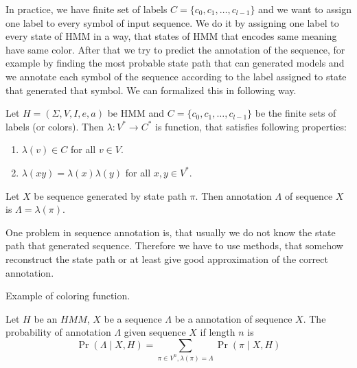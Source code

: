 In practice, we have finite set of labels $C=\{c_0,c_1,\dots,c_{l-1}\}$ and we
want to assign one label to every symbol of input sequence. We do it by
assigning one label to every state of HMM in a way, that states of HMM that
encodes same meaning have same color. After that we try to predict the
annotation of the sequence, for example by finding the most probable state path
that can generated models and we annotate each symbol of the sequence according
to the label assigned to state that generated that symbol. We can formalized
this in following way.


\begin{definition}
Let $H=(\Sigma,V,I,e,a)$ be HMM and $C=\{c_0,c_1,\dots,c_{l-1}\}$ be the finite
sets of labels (or colors). Then  
$\lambda: V^*\to C^*$ is function, that satisfies following properties:
\begin{enumerate}
\item $\lambda(v)\in C$ for all $v\in V$.
\item $\lambda(xy) = \lambda(x)\lambda(y)$ for all $x,y\in V^*$.
\end{enumerate}

Let $X$ be sequence generated by state path $\pi$. Then annotation
$\Lambda$ of sequence $X$ is $\Lambda = \lambda(\pi)$.
\end{definition}

One problem in sequence annotation is, that usually we do not know the state
path that generated sequence. Therefore we have to use methods, that somehow
reconstruct the state path or at least give good approximation of the correct
annotation. 

\begin{example}
Example of coloring function.
\end{example}


\begin{definition}
Let $H$ be an $HMM$, $X$ be a sequence $\Lambda$ be a annotation of sequence
$X$. The probability of annotation $\Lambda$ given sequence $X$ if length $n$ is 
\begin{equation}
\Pr\left(\Lambda\mid X,H\right)=\sum_{\pi \in V^n,\lambda(\pi) =
\Lambda}\Pr\left(\pi\mid X,H \right)\label{DEF:ANNOTATION:PROBABILITY}
\end{equation}
\end{definition}

